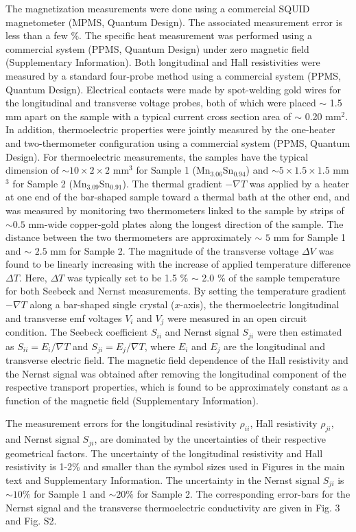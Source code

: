 \documentclass[amsmath,amssymb]{nature}
\begin{document}
The magnetization measurements were done using a commercial SQUID magnetometer (MPMS, Quantum Design). The associated measurement error is less than a few \%. The specific heat measurement was performed using a commercial system (PPMS, Quantum Design) under zero magnetic field (Supplementary Information). Both longitudinal and Hall resistivities were measured by a standard
four-probe method using a commercial system (PPMS, Quantum Design). Electrical contacts were made by spot-welding gold wires for the longitudinal and transverse voltage probes, both of which were placed $\sim$ 1.5 mm apart on the sample with a typical current cross section area of $\sim$ 0.20 mm$^2$. In addition, thermoelectric properties were jointly measured by the one-heater and two-thermometer configuration using a commercial system (PPMS, Quantum Design). For thermoelectric measurements, the samples have the typical dimension of $\sim 10\times2\times2$ mm$^3$ for Sample 1 (Mn$_{3.06}$Sn$_{0.94}$) and $\sim5\times1.5\times1.5$ mm$^3$ for Sample 2 (Mn$_{3.09}$Sn$_{0.91}$). The thermal gradient $-\nabla T$ was applied by a heater at one end of the bar-shaped sample toward a thermal bath at the other end, and was measured by monitoring two thermometers linked to the sample by strips of $\sim 0.5$ mm-wide copper-gold plates along the longest direction of the sample. The distance between the two thermometers are approximately $\sim$ $5$ mm for Sample 1 and $\sim$ $2.5$ mm for Sample 2. The magnitude of the transverse voltage $\Delta V$ was found to be linearly increasing with the increase of applied temperature difference $\Delta T$. Here, $\Delta T$ was typically set to be 1.5 \% $\sim$ 2.0 \% of the sample temperature for both Seebeck and Nernst measurements. By setting the temperature gradient $-\nabla T$ along a bar-shaped single crystal ($x$-axis), the thermoelectric longitudinal and transverse emf voltages $V_{i}$ and $V_{j}$ were measured in an open circuit condition. The Seebeck coefficient $S_{ii}$ and Nernst signal $S_{ji}$ were then estimated as $S_{ii} = E_{i}/\nabla T$ and $S_{ji} = E_{j}/\nabla T$, where $E_i$ and $E_j$ are the longitudinal and transverse electric field. 
The magnetic field dependence of the Hall resistivity and the Nernst signal was obtained after removing the longitudinal component of the respective transport properties, which is found to be approximately constant as a function of the magnetic field (Supplementary Information).

The measurement errors for the longitudinal resistivity $\rho_{ii}$, Hall resistivity $\rho_{ji}$, and Nernst signal $S_{ji}$, are dominated by the uncertainties of their respective geometrical factors. The uncertainty of the longitudinal resistivity and Hall resistivity is 1-2\% and smaller than the symbol sizes used in Figures in the main text and Supplementary Information. The uncertainty in the Nernst signal $S_{ji}$ is $\sim 10\%$ for Sample 1 and $\sim 20\%$ for Sample 2. The corresponding error-bars for the Nernst signal and the transverse thermoelectric conductivity are given in Fig. 3 and Fig. S2.
\end{document}
